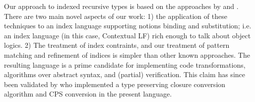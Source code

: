 \documentclass{article}
\begin{document}

Our approach to indexed recursive types is based on the approaches by
\cite{Zenger:TCS97} and \cite{Xi99popl}. There are two main 
novel aspects of our work:
1) the application of these techniques to an index language
supporting notions binding and substitution; i.e. an index language
(in this case, Contextual LF) rich enough to talk about object
logics. 2) The treatment of index contraints, and our treatment of
pattern matching and refinement of indices is simpler than other
known approaches. The resulting language is a prime candidate for
implementing code transformations, algorithms over abstract syntax,
and (partial) verification. This claim has since been validated by
\cite{Belanger13} who implemented a type preserving closure
conversion algorithm and CPS conversion in the present language.
\end{document}
